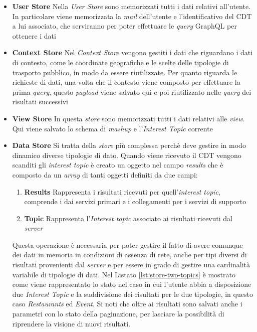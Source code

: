 \begin{itemize}
	\item  \textbf{User Store}
	Nella \emph{User Store} sono memorizzati tutti i dati relativi all'utente. In particolare viene memorizzata la \emph{mail} dell'utente e l'identificativo del CDT a lui associato, che serviranno per poter effettuare le \emph{query} GraphQL per ottenere i dati
	\item \textbf{Context Store}
	Nel \emph{Context Store} vengono gestiti i dati che riguardano i dati di contesto, come le coordinate geografiche e le scelte delle tipologie di trasporto pubblico, in modo da essere riutilizzate. Per quanto riguarda le richieste di dati, una volta che il contesto viene composto per effettuare la prima \emph{query}, questo \emph{payload} viene salvato qui e poi riutilizzato nelle \emph{query} dei risultati successivi
	\item \textbf{View Store}
	In questa \emph{store} sono memorizzati tutti i dati relativi alle \emph{view}. Qui viene salvato lo schema di \emph{mashup} e l'\emph{Interest Topic} corrente
	\item \textbf{Data Store}
	Si tratta della \emph{store} più complessa perchè deve gestire in modo dinamico diverse tipologie di dato. Quando viene ricevuto il CDT vengono scanditi gli \emph{interest topic} è creato un oggetto nel campo \emph{results} che è composto da un \emph{array} di tanti oggetti definiti da due campi:
	\begin{enumerate}
		\item \textbf{Results}
		Rappresenta i risultati ricevuti per quell'\emph{interest topic}, comprende i dai servizi primari e i collegamenti per i servizi di supporto
		\item \textbf{Topic}
		Rappresenta l'\emph{Interest topic} associato ai risultati ricevuti dal \emph{server}
	\end{enumerate}
	Questa operazione è necessaria per poter gestire il fatto di avere comunque dei dati in memoria in condizioni di assenza di rete, anche per tipi diversi di risultati provenienti dal \emph{server} e per essere in grado di gestire una cardinalità variabile di tipologie di dati. Nel Listato \ref{lst:store-two-topics} è mostrato come viene rappresentato lo stato nel caso in cui l'utente abbia a disposizione due \emph{Interest Topic} e la suddivisione dei risultati per le due tipologie, in questo caso \emph{Restaurants} ed \emph{Event}. Si noti che oltre ai risultati sono salvati anche i parametri con lo stato della paginazione, per lasciare la possibilità di riprendere la visione di nuovi risultati.
\end{itemize}

